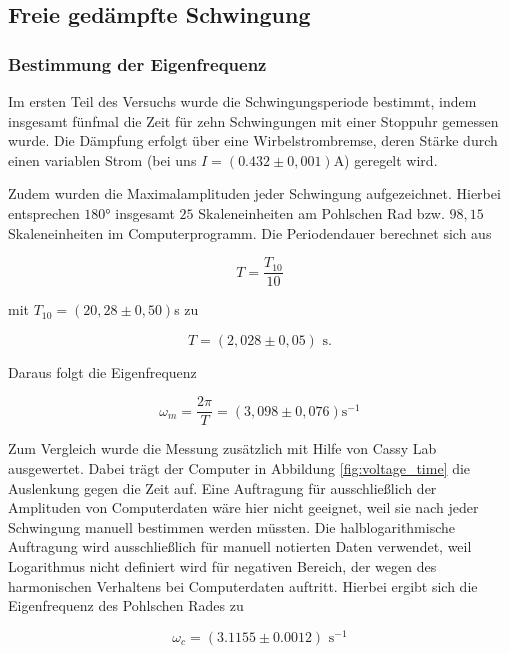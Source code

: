 \documentclass{article}
\begin{document}
\subsection{Freie gedämpfte Schwingung}
\subsubsection{Bestimmung der Eigenfrequenz}
\label{4.1.1}

Im ersten Teil des Versuchs wurde die Schwingungsperiode bestimmt, indem insgesamt fünfmal die Zeit für zehn Schwingungen mit einer Stoppuhr gemessen wurde. Die Dämpfung erfolgt über eine Wirbelstrombremse, deren Stärke durch einen variablen Strom (bei uns $I = (0.432 \pm 0,001)$A) geregelt wird.

Zudem wurden die Maximalamplituden jeder Schwingung aufgezeichnet. Hierbei entsprechen $180$° insgesamt $25$ Skaleneinheiten am Pohlschen Rad bzw. $98,15$ Skaleneinheiten im Computerprogramm. Die Periodendauer berechnet sich aus

\begin{equation}
    T = \frac{T_{10}}{10}
\end{equation}

mit $T_{10} = (20,28 \pm 0,50)$s zu

\begin{equation}
    T = (2,028 \pm 0,05) \text{ s}.
\end{equation}

Daraus folgt die Eigenfrequenz

\begin{equation}
    \omega_m = \frac{2\pi}{T} = (3,098 \pm 0,076) \text{s}^{-1}
\end{equation}

Zum Vergleich wurde die Messung zusätzlich mit Hilfe von Cassy Lab ausgewertet. Dabei trägt der Computer in Abbildung \ref{fig:voltage_time} die Auslenkung gegen die Zeit auf. Eine Auftragung für ausschließlich der Amplituden von Computerdaten wäre hier nicht geeignet, weil sie nach jeder Schwingung manuell bestimmen werden müssten. Die halblogarithmische Auftragung wird ausschließlich für manuell notierten Daten verwendet, weil Logarithmus nicht definiert wird für negativen Bereich, der wegen des harmonischen Verhaltens bei Computerdaten auftritt. Hierbei ergibt sich die Eigenfrequenz des Pohlschen Rades zu

\begin{equation}
\omega_c = (3.1155 \pm 0.0012) \text{ s}^{-1}
\end{equation}
\end{document}
